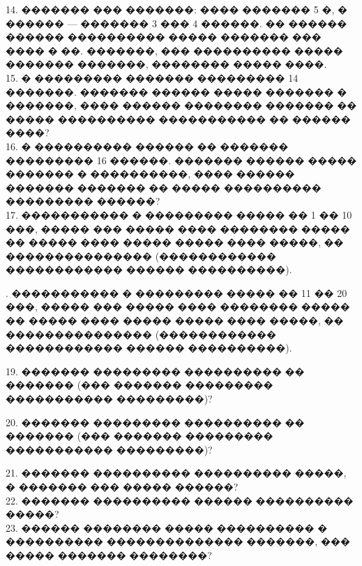 \documentclass[12pt]{article}
\begin{document}
14. ������� ��� �������: ���� ������� 5 �, � ������ --- ������� 3 ��� 4 ������. �� ������ ������ ���������� ����� ������� ��� ���� � ��. �������, ��� ���������� ����� ������� �������, �������� ����� ����.\\
15. � ��������� ������� ��������� 14 �������. ������� ������ ����� ������� � �������, ���� ������ �������� ������� �� ����� ���������� ����������� �� ������ ����?\\
16. � ���������� ������ �� ������� ��������� 16 ������. ������� ������ ����� ������� � ����������, ���� ������ ������� ������� �� ����� ���������� ��������� ������?\\
17. ����������� � ��������� ����� �� 1 �� 10 ���, ����� ��� ����� ���� �������� ����� �� ����� ���� ����� ����� ���� �����, �� ��������������� (������������ ������������ ������ ����������).
\begin{center}
\begin{figure}[ht!]
\end{figure}
\end{center}
\newpage
{}. ����������� � ��������� ����� �� 11 �� 20 ���, ����� ��� ����� ���� �������� ����� �� ����� ���� ����� ����� ���� �����, �� ��������������� (������������ ������������ ������ ����������).
\begin{center}
\begin{figure}[ht!]
\end{figure}
\end{center}
19. ������� ��������� ���������� �� ������� (��� ������� ��������� ����������� ���������)?
\begin{center}
\begin{figure}[ht!]
\end{figure}
\end{center}
20. ������� ��������� ���������� �� ������� (��� ������� ��������� ����������� ���������)?
\begin{center}
\begin{figure}[ht!]
\end{figure}
\end{center}
21. ������� ���������� ���������� �����, � ������� ��� ����� ������?\\
22. ������� ���������� ������ ���������� �����?\\
23. ������ �������� ����� ���������� � ���������� �������������� �������, ��� ����� ������� ��������?\\
\end{document}
